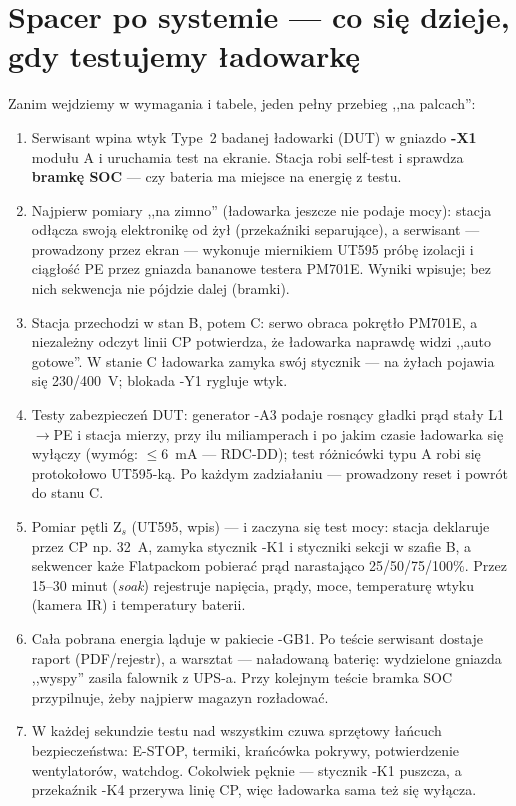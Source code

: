 \documentclass[11pt,a4paper]{article}
\begin{document}
\section{Spacer po systemie --- co się dzieje, gdy testujemy ładowarkę}
\label{sec:spacer}
Zanim wejdziemy w wymagania i tabele, jeden pełny przebieg ,,na palcach'':
\begin{enumerate}
\item Serwisant wpina wtyk Type~2 badanej ładowarki (DUT) w gniazdo \textbf{-X1} modułu A
i uruchamia test na ekranie. Stacja robi self-test i sprawdza \textbf{bramkę SOC} --- czy bateria
ma miejsce na energię z testu.
\item Najpierw pomiary ,,na zimno'' (ładowarka jeszcze nie podaje mocy): stacja odłącza swoją
elektronikę od żył (przekaźniki separujące), a serwisant --- prowadzony przez ekran ---
wykonuje miernikiem UT595 próbę izolacji i ciągłość PE przez gniazda bananowe testera PM701E.
Wyniki wpisuje; bez nich sekwencja nie pójdzie dalej (bramki).
\item Stacja przechodzi w stan B, potem C: serwo obraca pokrętło PM701E, a niezależny odczyt
linii CP potwierdza, że ładowarka naprawdę widzi ,,auto gotowe''. W stanie C ładowarka zamyka
swój stycznik --- na żyłach pojawia się 230/400~V; blokada -Y1 rygluje wtyk.
\item Testy zabezpieczeń DUT: generator -A3 podaje rosnący gładki prąd stały L1$\to$PE i stacja
mierzy, przy ilu miliamperach i po jakim czasie ładowarka się wyłączy (wymóg: $\le$6~mA ---
RDC-DD); test różnicówki typu A robi się protokołowo UT595-ką. Po każdym zadziałaniu ---
prowadzony reset i powrót do stanu C.
\item Pomiar pętli Z$_s$ (UT595, wpis) --- i zaczyna się test mocy: stacja deklaruje przez CP
np. 32~A, zamyka stycznik -K1 i styczniki sekcji w szafie B, a sekwencer każe Flatpackom
pobierać prąd narastająco 25/50/75/100\%. Przez 15--30 minut (\emph{soak}) rejestruje napięcia,
prądy, moce, temperaturę wtyku (kamera IR) i temperatury baterii.
\item Cała pobrana energia ląduje w pakiecie -GB1. Po teście serwisant dostaje raport
(PDF/rejestr), a warsztat --- naładowaną baterię: wydzielone gniazda ,,wyspy'' zasila falownik
z UPS-a. Przy kolejnym teście bramka SOC przypilnuje, żeby najpierw magazyn rozładować.
\item W każdej sekundzie testu nad wszystkim czuwa sprzętowy łańcuch bezpieczeństwa: E-STOP,
termiki, krańcówka pokrywy, potwierdzenie wentylatorów, watchdog. Cokolwiek pęknie --- stycznik
-K1 puszcza, a przekaźnik -K4 przerywa linię CP, więc ładowarka sama też się wyłącza.
\end{enumerate}
\end{document}
